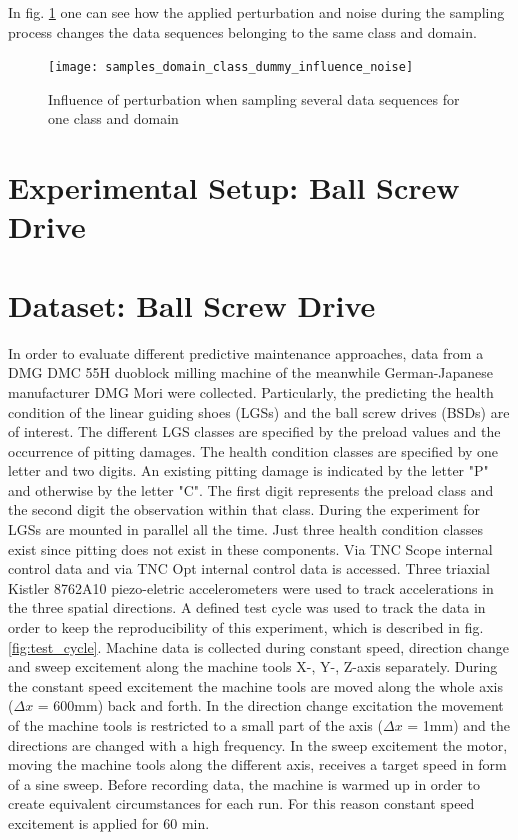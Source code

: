 In fig. \ref{fig:samples_domain_class_dummy_influence_noise} one can see how the applied perturbation and noise during the sampling process changes the data sequences belonging to the same class and domain. 


\begin{figure}[htpb]
  \centering
  \texttt{[image: samples\_domain\_class\_dummy\_influence\_noise]}
  \caption {Influence of perturbation when sampling several data sequences for one class and domain}
  \label{fig:samples_domain_class_dummy_influence_noise}
\end{figure}




\section{Experimental Setup: Ball Screw Drive}

\section{Dataset: Ball Screw Drive}
In order to evaluate different predictive maintenance approaches, data from a DMG DMC 55H duoblock milling machine of the meanwhile German-Japanese manufacturer DMG Mori were collected. Particularly, the predicting the health condition of the linear guiding shoes (LGSs) and the ball screw drives (BSDs) are of interest. The different LGS classes are specified by the preload values and the occurrence of pitting damages. The health condition classes are specified by one letter and two digits. An existing pitting damage is indicated by the letter "P" and otherwise by the letter "C". The first digit represents the preload class and the second digit the observation within that class. During the experiment for LGSs are mounted in parallel all the time. Just three health condition classes exist since pitting does not exist in these  components. Via TNC Scope internal control data and via TNC Opt internal control data is accessed. Three triaxial Kistler 8762A10 piezo-eletric accelerometers were used to track accelerations in the three spatial directions. A defined test cycle was used to track the data in order to keep the reproducibility of this experiment, which is described in fig. \ref{fig:test_cycle}. Machine data is collected during constant speed, direction change and sweep excitement along the machine tools X-, Y-, Z-axis separately. During the constant speed excitement the machine tools are moved along the whole axis  ($\Delta x$ = 600mm) back and forth. In the direction change excitation the movement of the machine tools is restricted to a small part of the axis ($\Delta x$ = 1mm) and the directions are changed with a high frequency. In the sweep excitement the motor, moving the machine tools along the different axis, receives a target speed in form of a sine sweep. Before recording data, the machine is warmed up in order to create equivalent circumstances for each run. For this reason constant speed excitement is applied for 60 min. 


